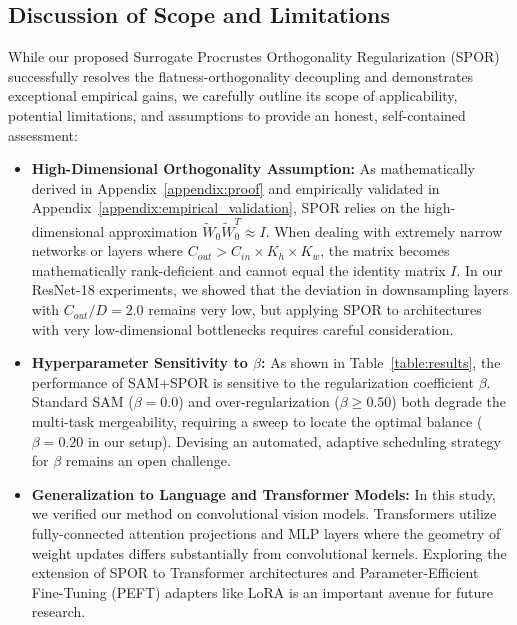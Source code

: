 \documentclass{article}
\theoremstyle{plain}
\theoremstyle{definition}
\theoremstyle{remark}
\begin{document}
\subsection{Discussion of Scope and Limitations}
\label{sec:limitations}
While our proposed Surrogate Procrustes Orthogonality Regularization (SPOR) successfully resolves the flatness-orthogonality decoupling and demonstrates exceptional empirical gains, we carefully outline its scope of applicability, potential limitations, and assumptions to provide an honest, self-contained assessment:
\begin{itemize}
    \item \textbf{High-Dimensional Orthogonality Assumption:} As mathematically derived in Appendix~\ref{appendix:proof} and empirically validated in Appendix~\ref{appendix:empirical_validation}, SPOR relies on the high-dimensional approximation $\tilde{W}_0 \tilde{W}_0^T \approx I$. When dealing with extremely narrow networks or layers where $C_{out} > C_{in} \times K_h \times K_w$, the matrix becomes mathematically rank-deficient and cannot equal the identity matrix $I$. In our ResNet-18 experiments, we showed that the deviation in downsampling layers with $C_{out}/D = 2.0$ remains very low, but applying SPOR to architectures with very low-dimensional bottlenecks requires careful consideration.
    \item \textbf{Hyperparameter Sensitivity to $\beta$:} As shown in Table~\ref{table:results}, the performance of SAM+SPOR is sensitive to the regularization coefficient $\beta$. Standard SAM ($\beta=0.0$) and over-regularization ($\beta \ge 0.50$) both degrade the multi-task mergeability, requiring a sweep to locate the optimal balance ($\beta=0.20$ in our setup). Devising an automated, adaptive scheduling strategy for $\beta$ remains an open challenge.
    \item \textbf{Generalization to Language and Transformer Models:} In this study, we verified our method on convolutional vision models. Transformers utilize fully-connected attention projections and MLP layers where the geometry of weight updates differs substantially from convolutional kernels. Exploring the extension of SPOR to Transformer architectures and Parameter-Efficient Fine-Tuning (PEFT) adapters like LoRA is an important avenue for future research.
\end{itemize}
\end{document}
